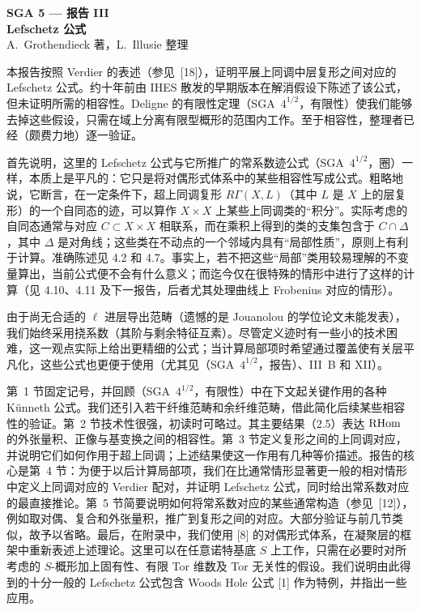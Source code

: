 \clearpage
{}
\begin{center}
{\Large \textbf{SGA 5 --- 报告 III}}\\[0.4em]
{\large \textbf{Lefschetz 公式}}\\[0.3em]
A.~Grothendieck 著，L.~Illusie 整理
\end{center}

本报告按照 Verdier 的表述（参见~[18]），证明平展上同调中层复形之间对应的 Lefschetz 公式。约十年前由 IHES 散发的早期版本在解消假设下陈述了该公式，但未证明所需的相容性。Deligne 的有限性定理（SGA~$4^{1/2}$，有限性）使我们能够去掉这些假设，只需在域上分离有限型概形的范围内工作。至于相容性，整理者已经（颇费力地）逐一验证。

首先说明，这里的 Lefschetz 公式与它所推广的常系数迹公式（SGA~$4^{1/2}$，圈）一样，本质上是平凡的：它只是将对偶形式体系中的某些相容性写成公式。粗略地说，它断言，在一定条件下，超上同调复形 $R\Gamma(X,L)$（其中 $L$ 是 $X$ 上的层复形）的一个自同态的迹，可以算作 $X\times X$ 上某些上同调类的“积分”。实际考虑的自同态通常与对应 $C\subset X\times X$ 相联系，而在乘积上得到的类的支集包含于 $C\cap\Delta$，其中 $\Delta$ 是对角线；这些类在不动点的一个邻域内具有“局部性质”，原则上有利于计算。准确陈述见 4.2 和 4.7。事实上，若不把这些“局部”类用较易理解的不变量算出，当前公式便不会有什么意义；而迄今仅在很特殊的情形中进行了这样的计算（见 4.10、4.11 及下一报告，后者尤其处理曲线上 Frobenius 对应的情形）。

由于尚无合适的 $\ell$ 进层导出范畴（遗憾的是 Jouanolou 的学位论文未能发表），我们始终采用挠系数（其阶与剩余特征互素）。尽管定义迹时有一些小的技术困难，这一观点实际上给出更精细的公式；当计算局部项时希望通过覆盖使有关层平凡化，这些公式也更便于使用（尤其见（SGA~$4^{1/2}$，报告）、III~B 和 XII）。

第~1 节固定记号，并回顾（SGA~$4^{1/2}$，有限性）中在下文起关键作用的各种 Künneth 公式。我们还引入若干纤维范畴和余纤维范畴，借此简化后续某些相容性的验证。第~2 节技术性很强，初读时可略过。其主要结果（2.5）表达 $\mathrm{RHom}$ 的外张量积、正像与基变换之间的相容性。第~3 节定义复形之间的上同调对应，并说明它们如何作用于超上同调；上述结果使这一作用有几种等价描述。报告的核心是第~4 节：为便于以后计算局部项，我们在比通常情形显著更一般的相对情形中定义上同调对应的 Verdier 配对，并证明 Lefschetz 公式，同时给出常系数对应的最直接推论。第~5 节简要说明如何将常系数对应的某些通常构造（参见~[12]），例如取对偶、复合和外张量积，推广到复形之间的对应。大部分验证与前几节类似，故予以省略。最后，在附录中，我们使用 [8] 的对偶形式体系，在凝聚层的框架中重新表述上述理论。这里可以在任意诺特基底 $S$ 上工作，只需在必要时对所考虑的 $S$-概形加上固有性、有限 Tor 维数及 Tor 无关性的假设。我们说明由此得到的十分一般的 Lefschetz 公式包含 Woods Hole 公式 [1] 作为特例，并指出一些应用。


